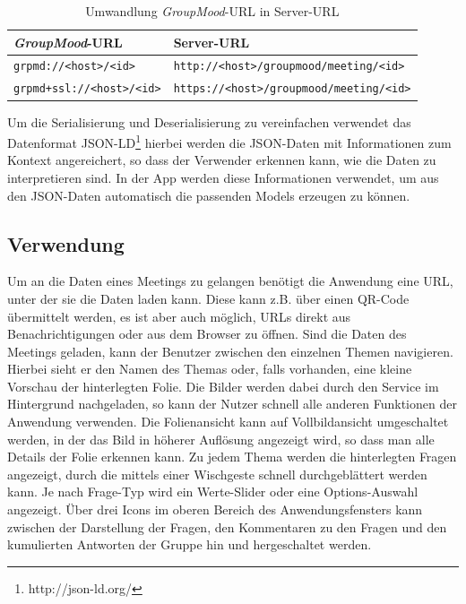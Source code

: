 \begin{table}[htb]
\begin{center}
\begin{tabular}{l l}
\emph{GroupMood}-URL & Server-URL \\
\hline
\texttt{grpmd://<host>/<id>} & \texttt{http://<host>/groupmood/meeting/<id>} \\
\texttt{grpmd+ssl://<host>/<id>} & \texttt{https://<host>/groupmood/meeting/<id>} \\
\end{tabular}
\caption{Umwandlung \emph{GroupMood}-URL in Server-URL}
\label{table:urlschema}
\end{center}
\end{table}

Um die Serialisierung und Deserialisierung zu vereinfachen verwendet das Datenformat JSON-LD\footnote{http://json-ld.org/} hierbei werden die JSON-Daten mit Informationen zum Kontext angereichert, so dass der Verwender erkennen kann, wie die Daten zu interpretieren sind. In der App werden diese Informationen verwendet, um aus den JSON-Daten automatisch die passenden Models erzeugen zu können.

\subsection{Verwendung}

Um an die Daten eines Meetings zu gelangen benötigt die Anwendung eine URL, unter der sie die Daten laden kann. Diese kann z.B. über einen QR-Code übermittelt werden, es ist aber auch möglich, URLs direkt aus Benachrichtigungen oder aus dem Browser zu öffnen. Sind die Daten des Meetings geladen, kann der Benutzer zwischen den einzelnen Themen navigieren. Hierbei sieht er den Namen des Themas oder, falls vorhanden, eine kleine Vorschau der hinterlegten Folie. Die Bilder werden dabei durch den Service im Hintergrund nachgeladen, so kann der Nutzer schnell alle anderen Funktionen der Anwendung verwenden. Die Folienansicht kann auf Vollbildansicht umgeschaltet werden, in der das Bild in höherer Auflösung angezeigt wird, so dass man alle Details der Folie erkennen kann. Zu jedem Thema werden die hinterlegten Fragen angezeigt, durch die mittels einer Wischgeste schnell durchgeblättert werden kann. Je nach Frage-Typ wird ein Werte-Slider oder eine Options-Auswahl angezeigt. Über drei Icons im oberen Bereich des Anwendungsfensters kann zwischen der Darstellung der Fragen, den Kommentaren zu den Fragen und den kumulierten Antworten der Gruppe hin und hergeschaltet werden.

